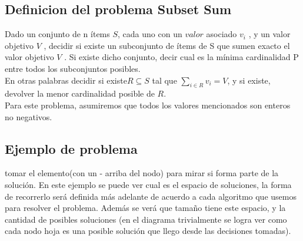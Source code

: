 
\subsection{Definicion del problema Subset Sum}
Dado un conjunto de n \'items $S$, cada uno con un $valor$ asociado $v_{i}$ , y un valor objetivo $V$ ,
decidir si existe un subconjunto de \'items de S que sumen exacto el valor objetivo $V$ . Si existe
dicho conjunto, decir cual es la m\'inima cardinalidad
P entre todos los subconjuntos posibles. \\
En otras palabras decidir si existe$ R \subseteq S$ tal que $\sum_{i \in R}v_{i} = V$, y si existe, devolver la menor cardinalidad posible de $R$.\\
Para este problema, asumiremos que todos los valores mencionados son enteros no negativos.
\subsection{Ejemplo de problema}

tomar el elemento(con un - arriba del nodo) para mirar si forma parte de la solución.
En este ejemplo se puede ver cual es el espacio de soluciones, la forma de recorrerlo será
definida más adelante  de acuerdo a cada algoritmo que usemos para resolver el problema.
Además se ver\'a que tamaño tiene este espacio, y la cantidad de posibles soluciones (en el diagrama trivialmente se logra ver como cada nodo hoja es una posible soluci\'on que llego desde las decisiones tomadas).
